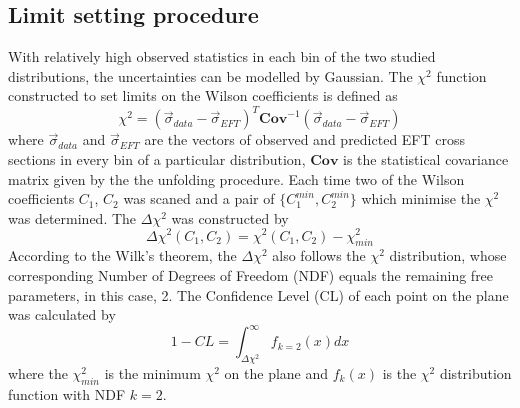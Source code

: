 \documentclass[a4paper,12pt]{article}
\begin{document}
		\subsection{Limit setting procedure} \label{ss:lsp}
			\par With relatively high observed statistics in each bin of the two studied distributions, the uncertainties
			can be modelled by Gaussian. The $\chi^2$ function constructed to set limits on the Wilson coefficients is defined as
			\begin{equation}\label{eq:chi2}
				\chi^2 = (\overrightarrow{\sigma}_{data} - \overrightarrow{\sigma}_{EFT})^T\textbf{Cov}^{-1}(\overrightarrow{\sigma}_{data} - \overrightarrow{\sigma}_{EFT})
			\end{equation}
			where $\overrightarrow{\sigma}_{data}$ and $\overrightarrow{\sigma}_{EFT}$ are the vectors of observed and predicted EFT cross sections in every bin of a particular distribution, 
			$\textbf{Cov}$ is the statistical covariance matrix given by the the unfolding procedure. Each time two of the Wilson coefficients $C_1$, $C_2$ was scaned and a pair of $\{C_1^{min}, C_2^{min}\}$ which minimise the 
			$\chi^2$ was determined. The $\Delta\chi^2$ was constructed by 
			\begin{equation}\label{eq:Dchi2}
				\Delta\chi^2(C_1, C_2) = \chi^2(C_1, C_2) - \chi^2_{min}
			\end{equation}
			According to the Wilk's theorem\cite{wilks1938}, the $\Delta\chi^2$ also follows the $\chi^2$ distribution, whose 
			corresponding Number of Degrees of Freedom (NDF) equals the remaining free parameters, in this case, 2.
			The Confidence Level (CL) of each point on the plane was calculated by 
			\begin{equation}
				1-CL = \int^{\infty}_{\Delta\chi^2}{f_{k=2}(x)dx}
			\end{equation}
			where the $\chi^2_{min}$ is the minimum $\chi^2$ on the plane and $f_k(x)$ is the $\chi^2$ 
			distribution function with NDF $k=2$. 
\end{document}
